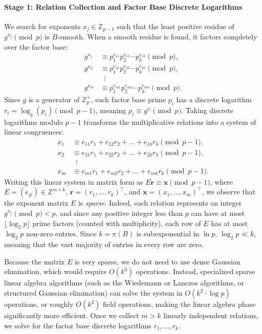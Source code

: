 \paragraph{Stage 1: Relation Collection and Factor Base Discrete Logarithms}
We search for exponents \(x_j \in \mathbb{Z}_{p-1}\) such that the least positive residue of \(g^{x_j} \pmod{p}\) is \(B\)-smooth.
When a smooth residue is found, it factors completely over the factor base:
\begin{align*}
    g^{x_1} &\equiv p_1^{e_{11}} p_2^{e_{12}} \cdots p_k^{e_{1k}} \pmod{p}, \\
    g^{x_2} &\equiv p_1^{e_{21}} p_2^{e_{22}} \cdots p_k^{e_{2k}} \pmod{p}, \\
    &\;\;\vdots \\
    g^{x_m} &\equiv p_1^{e_{m1}} p_2^{e_{m2}} \cdots p_k^{e_{mk}} \pmod{p}.
\end{align*}
Since \(g\) is a generator of \(\mathbb{Z}_p^\times\), each factor base prime \(p_i\) has a discrete logarithm \(r_i = \log_g(p_i) \pmod{p-1}\), meaning \(p_i \equiv g^{r_i} \pmod{p}\).
Taking discrete logarithms modulo \(p-1\) transforms the multiplicative relations into a system of linear congruences:
\begin{align*}
    x_1 &\equiv e_{11} r_1 + e_{12} r_2 + \dots + e_{1k} r_k \pmod{p-1}, \\
    x_2 &\equiv e_{21} r_1 + e_{22} r_2 + \dots + e_{2k} r_k \pmod{p-1}, \\
    &\;\;\vdots \\
    x_m &\equiv e_{m1} r_1 + e_{m2} r_2 + \dots + e_{mk} r_k \pmod{p-1}.
\end{align*}
Writing this linear system in matrix form as \(E \mathbf{r} \equiv \mathbf{x} \pmod{p-1}\), where \(E = (e_{ji}) \in \mathbb{Z}^{m \times k}\), \(\mathbf{r} = (r_1, \dots, r_k)^\top\), and \(\mathbf{x} = (x_1, \dots, x_m)^\top\), we observe that the exponent matrix \(E\) is \emph{sparse}.
Indeed, each relation represents an integer \(g^{x_j} \pmod{p} < p\), and since any positive integer less than \(p\) can have at most \(\lfloor \log_2 p \rfloor\) prime factors (counted with multiplicity), each row of \(E\) has at most \(\log_2 p\) non-zero entries.
Since \(k = \pi(B)\) is subexponential in \(\ln p\), \(\log_2 p \ll k\), meaning that the vast majority of entries in every row are zero.

Because the matrix \(E\) is very sparse, we do not need to use dense Gaussian elimination, which would require \(O(k^3)\) operations.
Instead, specialized sparse linear algebra algorithms (such as the Wiedemann or Lanczos algorithms, or structured Gaussian elimination) can solve the system in \(O(k^2 \cdot \log p)\) operations, or roughly \(O(k^2)\) field operations, making the linear algebra phase significantly more efficient.
Once we collect \(m > k\) linearly independent relations, we solve for the factor base discrete logarithms \(r_1, \dots, r_k\).

